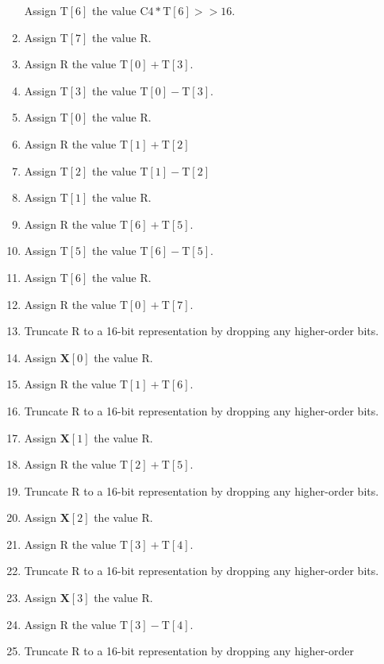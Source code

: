 \documentclass[9pt,letterpaper]{book}
\newcommand{\bitvar}[1]{\ensuremath{\mathbf{\bm{#1}}}}
\newcommand{\locvar}[1]{\ensuremath{\mathrm{#1}}}
\numberwithin{equation}{chapter}
\numberwithin{figure}{chapter}
\numberwithin{table}{chapter}
\begin{document}
\begin{enumerate}
Assign $\locvar{T}[6]$ the value $\locvar{C4}*\locvar{T}[6]>>16$.
\item
Assign $\locvar{T}[7]$ the value $\locvar{R}$.
\item
Assign \locvar{R} the value $\locvar{T}[0]+\locvar{T}[3]$.
\item
Assign $\locvar{T}[3]$ the value $\locvar{T}[0]-\locvar{T}[3]$.
\item
Assign $\locvar{T}[0]$ the value \locvar{R}.
\item
Assign \locvar{R} the value $\locvar{T}[1]+\locvar{T}[2]$
\item
Assign $\locvar{T}[2]$ the value $\locvar{T}[1]-\locvar{T}[2]$
\item
Assign $\locvar{T}[1]$ the value \locvar{R}.
\item
Assign \locvar{R} the value $\locvar{T}[6]+\locvar{T}[5]$.
\item
Assign $\locvar{T}[5]$ the value $\locvar{T}[6]-\locvar{T}[5]$.
\item
Assign $\locvar{T}[6]$ the value \locvar{R}.
\item
Assign \locvar{R} the value $\locvar{T}[0]+\locvar{T}[7]$.
\item
Truncate \locvar{R} to a 16-bit representation by dropping any higher-order
 bits.
\item
Assign $\bitvar{X}[0]$ the value \locvar{R}.
\item
Assign \locvar{R} the value $\locvar{T}[1]+\locvar{T}[6]$.
\item
Truncate \locvar{R} to a 16-bit representation by dropping any higher-order
 bits.
\item
Assign $\bitvar{X}[1]$ the value \locvar{R}.
\item
Assign \locvar{R} the value $\locvar{T}[2]+\locvar{T}[5]$.
\item
Truncate \locvar{R} to a 16-bit representation by dropping any higher-order
 bits.
\item
Assign $\bitvar{X}[2]$ the value \locvar{R}.
\item
Assign \locvar{R} the value $\locvar{T}[3]+\locvar{T}[4]$.
\item
Truncate \locvar{R} to a 16-bit representation by dropping any higher-order
 bits.
\item
Assign $\bitvar{X}[3]$ the value \locvar{R}.
\item
Assign \locvar{R} the value $\locvar{T}[3]-\locvar{T}[4]$.
\item
Truncate \locvar{R} to a 16-bit representation by dropping any higher-order

\end{enumerate}
\end{document}
